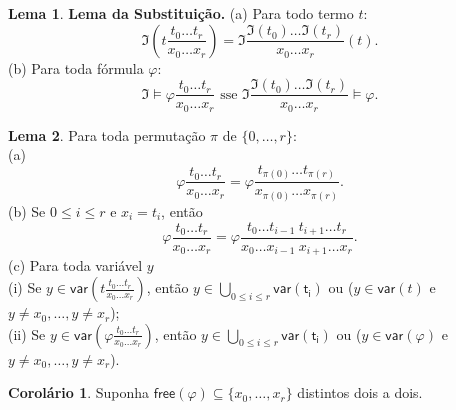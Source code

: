 \documentclass[11pt]{article}
\theoremstyle{definition}
\newtheorem{corollary}{Corolário}
\newtheorem{lemma}{Lema}
\newcommand{\mf}[1]{\mathfrak{#1}}
\newcommand{\msf}[1]{\mathsf{#1}}
\begin{document}
\begin{lemma}
\textbf{Lema da Substituição.} (a) Para todo termo $t$:
\[
\mf{I}\left(t\frac{t_0\dots t_r}{x_0\dots x_r}\right)=\mf{I}\frac{\mf{I}(t_0)\dots\mf{I}(t_r)}{x_0\dots x_r}(t).
\]
(b) Para toda fórmula $\varphi$:
\[
\mf{I}\vDash\varphi\frac{t_0\dots t_r}{x_0\dots x_r}\text{ sse }\mf{I}\frac{\mf{I}(t_0)\dots\mf{I}(t_r)}{x_0\dots x_r}\vDash\varphi.
\]
\end{lemma}

\begin{lemma}
Para toda permutação $\pi$ de $\{0,\dots,r\}$:\\
(a)
\[
\varphi\frac{t_0\dots t_r}{x_0\dots x_r}=\varphi\frac{t_{\pi(0)}\dots t_{\pi(r)}}{x_{\pi(0)}\dots x_{\pi(r)}}.
\]
(b) Se $0\le i\le r$ e $x_i=t_i$, então
\[
\varphi\frac{t_0\dots t_r}{x_0\dots x_r}=\varphi\frac{t_0\dots t_{i-1}~t_{i+1}\dots t_r}{x_0\dots x_{i-1}~x_{i+1}\dots x_r}.
\]
(c) Para toda variável $y$\\
(i) Se $y\in\msf{var}\left(t\frac{t_0\dots t_r}{x_0\dots x_r}\right)$, então $y\in\bigcup_{0\le i\le r}\msf{var(t_i)}$ ou ($y\in\msf{var}(t)$ e $y\ne x_0,\dots,y\ne x_r$);\\
(ii) Se $y\in\msf{var}\left(\varphi\frac{t_0\dots t_r}{x_0\dots x_r}\right)$, então $y\in\bigcup_{0\le i\le r}\msf{var(t_i)}$ ou ($y\in\msf{var}(\varphi)$ e $y\ne x_0,\dots,y\ne x_r$).\\
\end{lemma}

\begin{corollary}
Suponha $\msf{free}(\varphi)\subseteq\{x_0,\dots,x_r\}$ distintos dois a dois.
\end{corollary}
\end{document}
